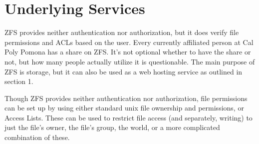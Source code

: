 \section{Underlying Services}

ZFS provides neither authentication nor authorization, but it does verify file permissions and ACLs based on the user. Every currently affiliated person at Cal Poly Pomona has a share on ZFS. It's not optional whether to have the share or not, but how many people actually utilize it is questionable. The main purpose of ZFS is storage, but it can also be used as a web hosting service as outlined in section 1.

Though ZFS provides neither authentication nor authorization, file permissions can be set up by using either standard unix file ownership and permissions, or Access Lists. These can be used to restrict file access (and separately, writing) to just the file's owner, the file's group, the world, or a more complicated combination of these.
